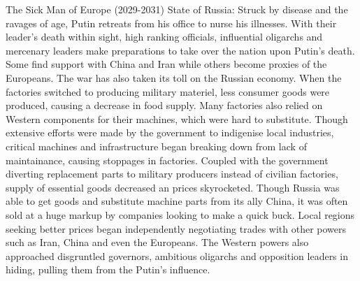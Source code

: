     The Sick Man of Europe (2029-2031)
        State of Russia:
            Struck by disease and the ravages of age, Putin retreats from his office to nurse his illnesses. With their leader's death within sight, high ranking officials, influential oligarchs and mercenary leaders make preparations to take over the nation upon Putin's death. Some find support with China and Iran while others become proxies of the Europeans.
            The war has also taken its toll on the Russian economy. When the factories switched to producing military materiel, less consumer goods were produced, causing a decrease in food supply. Many factories also relied on Western components for their machines, which were hard to substitute. Though extensive efforts were made by the government to indigenise local industries, critical machines and infrastructure began breaking down from lack of maintainance, causing stoppages in factories. Coupled with the government diverting replacement parts to military producers instead of civilian factories, supply of essential goods decreased an prices skyrocketed.
            Though Russia was able to get goods and substitute machine parts from its ally China, it was often sold at a huge markup by companies looking to make a quick buck. Local regions seeking better prices began independently negotiating trades with other powers such as Iran, China and even the Europeans. The Western powers also approached disgruntled governors, ambitious oligarchs and opposition leaders in hiding, pulling them from the Putin's influence.
    
